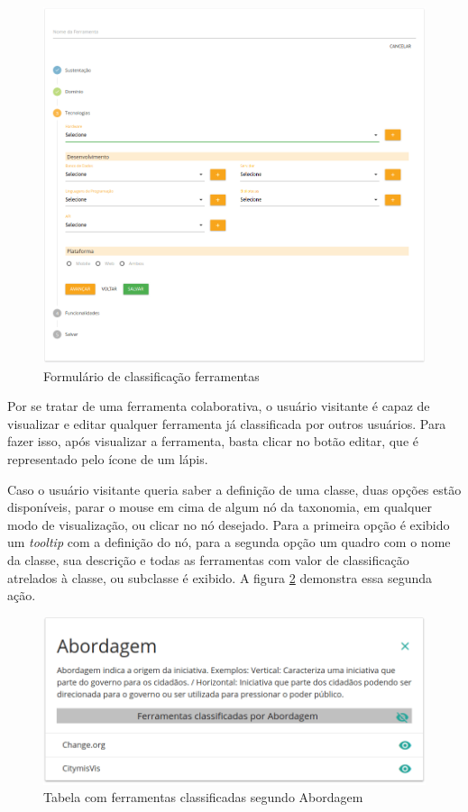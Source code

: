 \begin{figure}[!ht]
    \centering
    \includegraphics[scale=0.20]{./figuras/new-ferramenta.png}
    \caption{Formulário de classificação ferramentas}
    \label{fig:new-ferramenta}
\end{figure}

\par
Por se tratar de uma ferramenta colaborativa, o usuário visitante é capaz de visualizar e editar qualquer ferramenta já classificada por outros usuários. 
Para fazer isso, após visualizar a ferramenta, basta clicar no botão editar, que é representado pelo ícone de um lápis. 

\newpage
\par
Caso o usuário visitante queria saber a definição de uma classe, duas opções estão disponíveis, parar o mouse em cima de algum nó da taxonomia, em qualquer modo de visualização, 
ou clicar no nó desejado. Para a primeira opção é exibido um \textit{tooltip} com a definição do nó, para a segunda opção um quadro com o nome da classe, sua descrição e 
todas as ferramentas com valor de classificação atrelados à classe, ou subclasse é exibido. A figura \ref{fig:tabela-ferramentas} demonstra essa segunda ação. 

\begin{figure}[!ht]
    \centering
    \includegraphics[scale=0.20]{./figuras/abordagem.png}
    \caption{Tabela com ferramentas classificadas segundo Abordagem}
    \label{fig:tabela-ferramentas}
\end{figure}